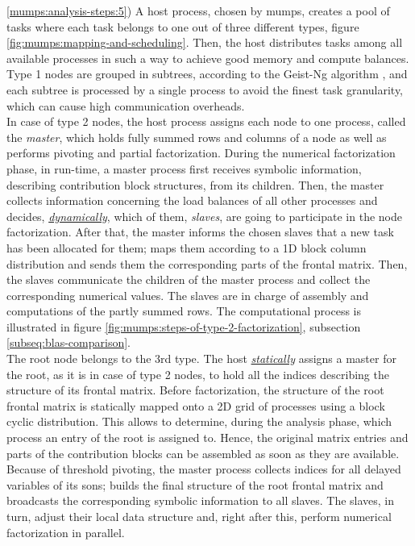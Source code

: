 \ref{mumps:analysis-steps:5}) A host process, chosen by \acrshort{mumps}, creates a pool of tasks where each task belongs to one out of three different types, figure \ref{fig:mumps:mapping-and-scheduling}. Then, the host distributes tasks among all available processes in such a way to achieve good memory and compute balances.\\

 
Type 1 nodes are grouped in subtrees, according to the Geist-Ng algorithm \cite{geist1989task}, and each subtree is processed by a single process to avoid the finest task granularity, which can cause high communication overheads. \\


In case of type 2 nodes, the host process assigns each node to one process, called the \textit{master}, which holds fully summed rows and columns of a node as well as performs pivoting and partial factorization. During the numerical factorization phase, in run-time, a master process first receives symbolic information, describing  contribution block structures, from its children. Then, the master collects information concerning the load balances of all other processes and decides, \underline{\textit{dynamically}},  which of them, \textit{slaves}, are going to participate in the node factorization. After that, the master informs the chosen slaves that a new task has been allocated for them; maps them according to a 1D block column distribution and sends them the corresponding parts of the frontal matrix. Then, the slaves communicate the children of the master process and collect the corresponding numerical values. The slaves are in charge of assembly and computations of the partly summed rows. The computational process is illustrated in figure \ref{fig:mumps:steps-of-type-2-factorization}, subsection \ref{subseq:blas-comparison}.\\


The root node belongs to the 3rd type. The host \underline{\textit{statically}} assigns a master for the root, as it is in case of type 2 nodes, to hold all the indices describing the structure of its frontal matrix. Before factorization, the structure of the root frontal matrix is statically mapped onto a 2D grid of processes using a block cyclic distribution. This allows to determine, during the analysis phase, which process an entry of the root is assigned to. Hence, the original matrix entries and parts of the contribution blocks can be assembled as soon as they are available. Because of threshold pivoting, the master process collects indices for all delayed variables of its sons; builds the final structure of the root frontal matrix and broadcasts the corresponding symbolic information to all slaves. The slaves, in turn, adjust their local data structure and, right after this, perform numerical factorization in parallel.\\


